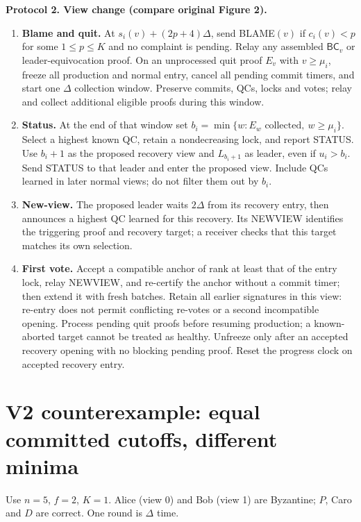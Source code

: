 \documentclass[10pt,a4paper]{article}
\newcommand{\BC}{\mathsf{BC}}
\newcommand{\chg}[1]{\textcolor{red!70!black}{#1}}
\begin{document}
\begin{mdframed}[linewidth=.6pt,innertopmargin=5pt,innerbottommargin=5pt]
\textbf{Protocol 2. View change (compare original Figure 2).}
\begin{enumerate}[label=\textbf{\roman*.},itemsep=3pt]
\item \textbf{Blame and quit.} At $s_i(v)+(2p+4)\Delta$, send BLAME$(v)$
if $c_i(v)<p$ for some $1\le p\le K$ and no complaint is pending.
Relay any assembled $\BC_v$ or leader-equivocation proof.
\chg{On an unprocessed quit proof $E_v$ with $v\ge\mu_i$, freeze all
production and normal entry, cancel all pending commit timers, and start
one $\Delta$ collection window. Preserve commits, QCs, locks and votes;
relay and collect additional eligible proofs during this window.}
\item \textbf{Status.} At the end of that window set
\chg{$b_i=\min\{w:E_w\text{ collected},\ w\ge\mu_i\}$}.
Select a highest known QC, retain a nondecreasing lock, and report STATUS.
\chg{Use $b_i+1$ as the proposed recovery view and $L_{b_i+1}$ as leader,
even if $u_i>b_i$. Send STATUS to that leader and enter the proposed view.
Include QCs learned in later normal views; do not filter them out by $b_i$.}
\item \textbf{New-view.} The proposed leader waits $2\Delta$ from its
recovery entry, then announces a highest QC learned for this recovery.
\chg{Its NEWVIEW identifies the triggering proof and recovery target;
a receiver checks that this target matches its own selection.}
\item \textbf{First vote.} Accept a compatible anchor of rank at least
that of the entry lock, relay NEWVIEW, and re-certify the anchor without a
commit timer; then extend it with fresh batches.
\chg{Retain all earlier signatures in this view: re-entry does not permit
conflicting re-votes or a second incompatible opening. Process pending quit
proofs before resuming production; a known-aborted target cannot be treated
as healthy. Unfreeze only after an accepted recovery opening with no
blocking pending proof. Reset the progress clock on accepted recovery entry.}
\end{enumerate}
\end{mdframed}

\clearpage
\section*{V2 counterexample: equal committed cutoffs, different minima}
Use $n=5$, $f=2$, $K=1$. Alice (view 0) and Bob (view 1) are Byzantine;
$P$, Caro and $D$ are correct. One round is $\Delta$ time.
\end{document}
